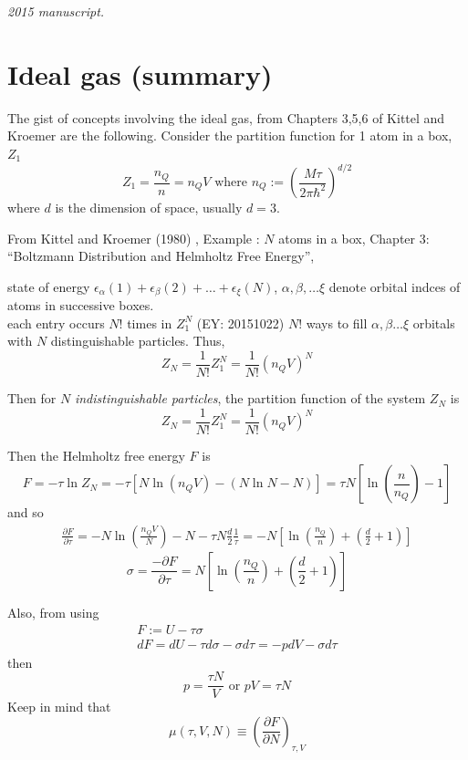 \noindent\textit{2015 manuscript.}

\section{Ideal gas (summary)}

The gist of concepts involving the ideal gas, from Chapters 3,5,6 of Kittel and Kroemer \cite{CKittelHKroemer1980} are the following.  Consider the partition function for 1 atom in a box, $Z_1$
\[
Z_1 = \frac{n_Q}{n} = n_Q V \text{ where } n_Q := \left( \frac{M\tau}{2\pi \hbar^2} \right)^{d/2}
\]
where $d$ is the dimension of space, usually $d=3$.  

From Kittel and Kroemer (1980) \cite{CKittelHKroemer1980}, Example : $N$ atoms in a box, Chapter 3: ``Boltzmann Distribution and Helmholtz Free Energy'', 

state of energy $\epsilon_{\alpha}(1) + \epsilon_{\beta}(2) + \dots + \epsilon_{\xi}(N)$, $\alpha, \beta, \dots \xi$ denote orbital indces of atoms in successive boxes.  \\
each entry occurs $N!$ times in $Z_1^N$ (EY: 20151022) $N!$ ways to fill $\alpha, \beta \dots \xi$ orbitals with $N$ distinguishable particles.  Thus,
\[
Z_N = \frac{1}{N!} Z_1^N = \frac{1}{N!} (n_Q V)^N
\]


Then for $N$ \emph{indistinguishable particles}, the partition function of the system $Z_N$ is 
\begin{equation}
  Z_N = \frac{1}{N!} Z_1^N = \frac{1}{N!}(n_QV)^N
\end{equation}

Then the Helmholtz free energy $F$ is 
\begin{equation}
  F = -\tau \ln{Z_N} = -\tau \left[ N \ln{ (n_Q V) } - (N\ln{N} - N) \right] = \tau N \left[ \ln{ \left( \frac{n}{n_Q} \right) - 1  }\right]
\end{equation}
and so 
\[
\begin{gathered}
  \frac{ \partial F}{ \partial \tau} = - N \ln{ \left( \frac{n_Q V}{N} \right) } - N - \tau N \frac{d}{2} \frac{1}{\tau}  = -N \left[ \ln{ \left( \frac{n_Q}{n} \right) } + \left( \frac{d}{2} + 1 \right) \right] 
\end{gathered}
\]
\begin{equation}
  \sigma = \frac{ -\partial F}{ \partial \tau} = N \left[ \ln{ \left( \frac{n_Q}{n} \right) } + \left( \frac{d}{2} + 1 \right) \right]
\end{equation}

Also, from using 
\[
\begin{gathered}
  F := U -\tau \sigma \\ 
  dF = dU -\tau d\sigma - \sigma d\tau = - p dV - \sigma d\tau 
\end{gathered}
\]
then
\[
p=\frac{\tau N}{V} \text{ or } pV = \tau N
\]
Keep in mind that 
\[
\mu(\tau, V,N) \equiv \left( \frac{ \partial F}{\partial N} \right)_{\tau,V}
\]

